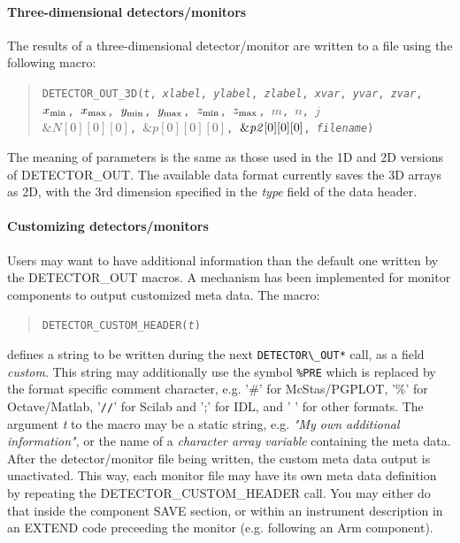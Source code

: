 \paragraph{Three-dimensional detectors/monitors}

The results of a three-dimensional detector/\discretionary{}{}{}mon\-i\-tor are written to a file using the
following macro:

\begin{quote}
  \texttt{DETECTOR\_OUT\_3D({\it t},
        {\it xlabel}, {\it ylabel}, {\it zlabel},
        {\it xvar}, {\it yvar}, {\it zvar},
        $x_{\rm min}$, $x_{\rm max}$, $y_{\rm min}$, $y_{\rm max}$,
        $z_{\rm min}$, $z_{\rm max}$, $m$, $n$, $j$\\
          $\&N[0][0][0]$, $\&p[0][0][0]$, $\&{\it p2}[0][0][0]$,
        {\it filename})}
\end{quote}
The meaning of parameters is the same as those used in the 1D and 2D
versions of DETECTOR\_OUT. The available data format currently saves
the 3D arrays as 2D, with the 3rd dimension specified in the {\it
  type} field of the data header.

\paragraph{Customizing detectors/monitors}

Users may want to have additional information than the default one written by the DETECTOR\_OUT macros. A mechanism has been implemented for monitor components to output customized meta data. The macro:

\begin{quote}
  \texttt{DETECTOR\_CUSTOM\_HEADER({\it t})}
\end{quote}

defines a string to be written during the next \verb+DETECTOR\_OUT*+ call, as a field {\it custom}. This string may additionally use the symbol \verb+%PRE+ which is replaced by the format specific comment character, e.g. '\#' for McStas/PGPLOT, '\%' for Octave/Matlab, '\verb+//+' for Scilab and ';' for IDL, and ' ' for other formats. The argument {\it t} to the macro may be a static string, e.g. {\it "My own additional information"}, or the name of a {\it character array variable} containing the meta data. After the detector/monitor file being written, the custom meta data output is unactivated. This way, each monitor file may have its own meta data definition by repeating the DETECTOR\_CUSTOM\_HEADER call. You may either do that inside the component SAVE section, or within an instrument description in an EXTEND code preceeding the monitor (e.g. following an Arm component).


